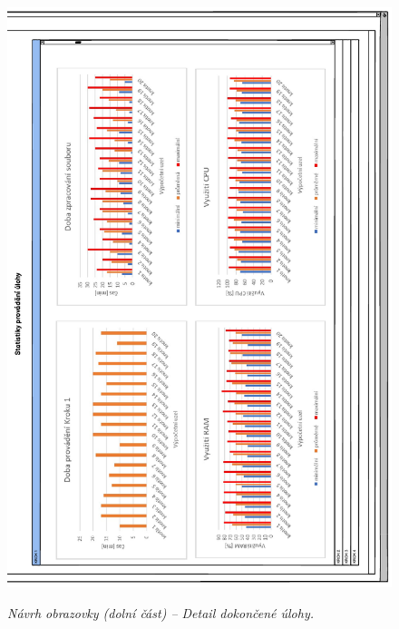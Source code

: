 \begin{figure}[H]
\begin{center}
    \scalebox{1.0}
    {   
        \includegraphics{images/wireframe_finishedTaskDetail_2.pdf}
    }
    \caption{\label{obr:wireframe_finishedTaskDetail_2} {\it Návrh obrazovky (dolní část) -- Detail dokončené úlohy.}}
\end{center}
\end{figure}

